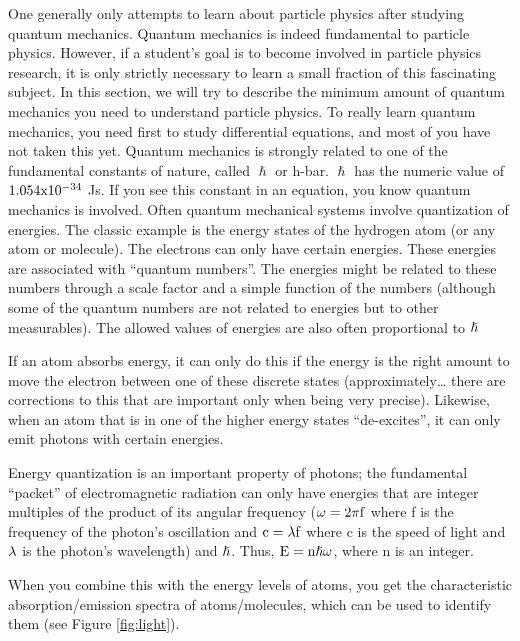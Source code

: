 One generally only attempts to learn about particle physics after studying quantum mechanics. Quantum mechanics is indeed fundamental to particle physics.  However, if a 
student's goal is to become involved in particle physics research, it is only strictly necessary to learn a small fraction of this fascinating subject.  In this section, we will try to describe the minimum amount of quantum mechanics you need to understand particle physics.  To really learn quantum mechanics, you need first to study differential equations, and most of you have not taken this yet.
Quantum mechanics is strongly related to one of the fundamental constants of nature, called 
$\hslash$ or h-bar.  $\hslash$ has the numeric value of ${\rm 1.054x10^{-34}}$ Js.  
If you see this constant in an equation, you know quantum mechanics is involved.
Often quantum mechanical systems involve quantization of energies.  The classic example is the energy states of the hydrogen atom (or any atom or molecule).  The electrons can only have certain energies.  These energies are associated with ``quantum numbers''.  The energies might be related to these numbers through a scale factor and a simple function of the numbers 
(although some of the quantum numbers are not related to energies but to other measurables).  The allowed values of energies are also often proportional to
${\rm \hslash}$

If an atom absorbs energy, it can only do this if the energy is the right amount to move the electron between one of these discrete states (approximately… there are corrections to this that are important only when being very precise).  Likewise, when an atom that is in one of the higher energy states “de-excites”, it can only emit photons with certain energies.

Energy quantization is an important property of  photons; the fundamental “packet” of electromagnetic radiation can only have energies that are integer multiples of the product of its angular frequency (${\rm \omega = 2 \pi f}$ where f is the frequency of the photon’s oscillation and ${\rm c = \lambda f}$  where c is the speed of light and ${\rm \lambda}$  is the photon’s wavelength) and ${\rm \hslash}$.  
Thus, ${\rm E=n \hslash \omega}$,  where n is an integer.

When you combine this with the energy levels of atoms, you get the characteristic absorption/emission spectra of atoms/molecules, which can be used to identify them (see Figure \ref{fig:light}).


